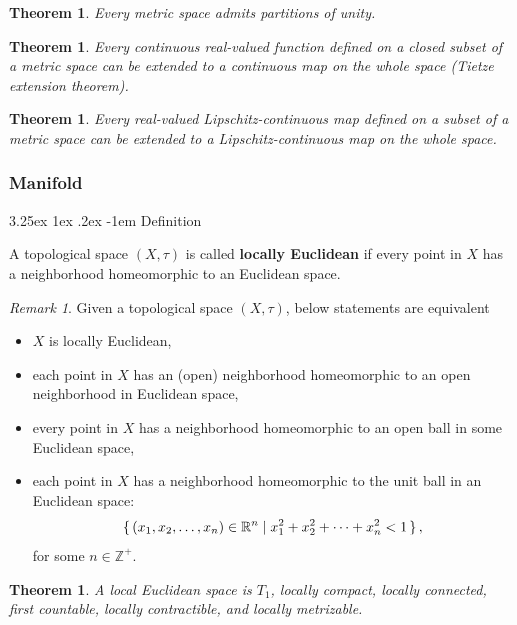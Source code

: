 \documentclass[12pt, letterpaper]{article}
\makeatletter
\newcommand{\inte}{\mathbb{Z}}
\newcommand{\re}{\mathbb{R}}
\newtheorem{thm}[prop]{Theorem}
\renewcommand\paragraph{\@startsection{paragraph}{4}{\z@}%
	{3.25ex \@plus1ex \@minus.2ex}%
	{-1em}%
	{\normalfont\normalsize\bfseries}}
\theoremstyle{definition}
\theoremstyle{remark}
\newtheorem*{rem*}{Remark}
\theoremstyle{definition}
\theoremstyle{plain}
\numberwithin{equation}{section}
\makeatother
\begin{document}
	\begin{thm}
		Every metric space admits partitions of unity.
	\end{thm}

	\begin{thm}
		Every continuous real-valued function defined on a closed subset of a metric space can be extended to a continuous map on the whole space (Tietze extension theorem).
	\end{thm}

	\begin{thm}
		Every real-valued Lipschitz-continuous map defined on a subset of a metric space can be extended to a Lipschitz-continuous map on the whole space.
	\end{thm}
	
	\subsubsection{Manifold}
	\paragraph{Definition}
	\begin{def*}
		A topological space $(X,\tau)$ is called \textbf{locally Euclidean}
		if every point in $X$ has a neighborhood homeomorphic to an Euclidean space.
	\end{def*}
	\begin{rem*}
		Given a topological space $(X,\tau)$, below statements are equivalent
		\begin{itemize}
			\item $X$ is locally Euclidean,
			\item each point in $X$ has an (open) neighborhood homeomorphic to an open neighborhood in Euclidean space,
			\item every point in $X$ has a neighborhood homeomorphic to an open ball in some Euclidean space,
			\item each point in $X$ has a neighborhood homeomorphic to the unit ball in an Euclidean space:
			\[ \set{(x_{1},x_{2},\dots ,x_{n})\in \mathbb {R} ^{n}\mid x_{1}^{2}+x_{2}^{2}+\cdots +x_{n}^{2}<1} ,\]
			for some $n\in\inte^+$.
		\end{itemize}		
	\end{rem*}

	\begin{thm}
		A local Euclidean space is $T_1$,
		locally compact, locally connected, first countable, locally contractible, and locally metrizable.
	\end{thm}
	
\end{document}
